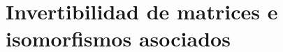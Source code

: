 \documentclass[notasLineal]{subfiles}
\begin{document}
\section{Invertibilidad de matrices e isomorfismos asociados}\label{Sec: Invertibilidad de matrices e isomorfismos asociados}
\end{document}
